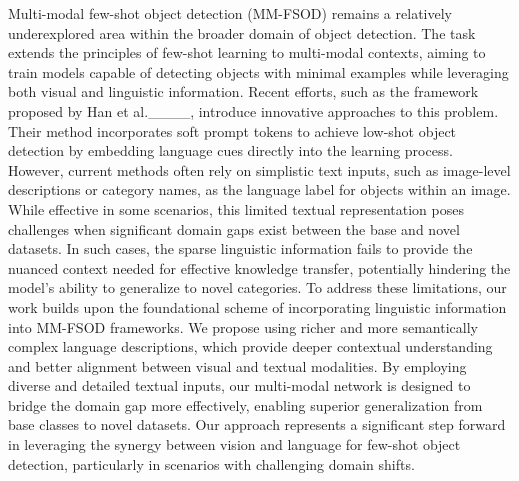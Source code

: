 Multi-modal few-shot object detection (MM-FSOD) remains a relatively underexplored area within the broader domain of object detection. The task extends the principles of few-shot learning to multi-modal contexts, aiming to train models capable of detecting objects with minimal examples while leveraging both visual and linguistic information. Recent efforts, such as the framework proposed by Han et al.____, introduce innovative approaches to this problem. Their method incorporates soft prompt tokens to achieve low-shot object detection by embedding language cues directly into the learning process. 
However, current methods often rely on simplistic text inputs, such as image-level descriptions or category names, as the language label for objects within an image. While effective in some scenarios, this limited textual representation poses challenges when significant domain gaps exist between the base and novel datasets. In such cases, the sparse linguistic information fails to provide the nuanced context needed for effective knowledge transfer, potentially hindering the model’s ability to generalize to novel categories.
To address these limitations, our work builds upon the foundational scheme of incorporating linguistic information into MM-FSOD frameworks. We propose using richer and more semantically complex language descriptions, which provide deeper contextual understanding and better alignment between visual and textual modalities. By employing diverse and detailed textual inputs, our multi-modal network is designed to bridge the domain gap more effectively, enabling superior generalization from base classes to novel datasets. Our approach represents a significant step forward in leveraging the synergy between vision and language for few-shot object detection, particularly in scenarios with challenging domain shifts.

